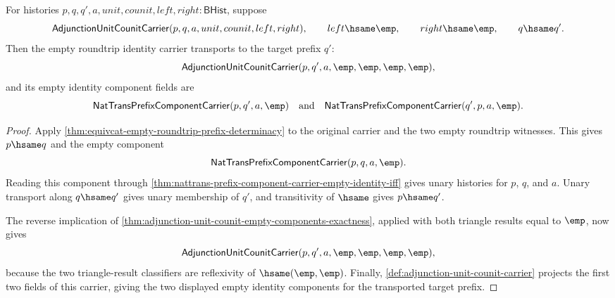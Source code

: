 \begin{theorem}
\label{thm:equivcat-empty-roundtrip-identity-carrier-target-prefix-hsame-transport}
For histories $p,q,q',a,unit,counit,left,right:\mathsf{BHist}$, suppose
$$
\mathsf{AdjunctionUnitCounitCarrier}(p,q,a,unit,counit,left,right),
\qquad
left\hsame\emp,
\qquad
right\hsame\emp,
\qquad
q\hsame q'.
$$
Then the empty roundtrip identity carrier transports to the target prefix $q'$:
$$
\mathsf{AdjunctionUnitCounitCarrier}(p,q',a,\emp,\emp,\emp,\emp),
$$
and its empty identity component fields are
$$
\mathsf{NatTransPrefixComponentCarrier}(p,q',a,\emp)
\quad\text{and}\quad
\mathsf{NatTransPrefixComponentCarrier}(q',p,a,\emp).
$$
\end{theorem}
\begin{proof}
Apply \autoref{thm:equivcat-empty-roundtrip-prefix-determinacy} to the original carrier and the two empty roundtrip witnesses. This gives $p\hsame q$ and the empty component
$$
\mathsf{NatTransPrefixComponentCarrier}(p,q,a,\emp).
$$
Reading this component through \autoref{thm:nattrans-prefix-component-carrier-empty-identity-iff} gives unary histories for $p$, $q$, and $a$. Unary transport along $q\hsame q'$ gives unary membership of $q'$, and transitivity of $\hsame$ gives $p\hsame q'$.

The reverse implication of \autoref{thm:adjunction-unit-counit-empty-components-exactness}, applied with both triangle results equal to $\emp$, now gives
$$
\mathsf{AdjunctionUnitCounitCarrier}(p,q',a,\emp,\emp,\emp,\emp),
$$
because the two triangle-result classifiers are reflexivity of $\hsame(\emp,\emp)$. Finally, \autoref{def:adjunction-unit-counit-carrier} projects the first two fields of this carrier, giving the two displayed empty identity components for the transported target prefix.
\end{proof}

